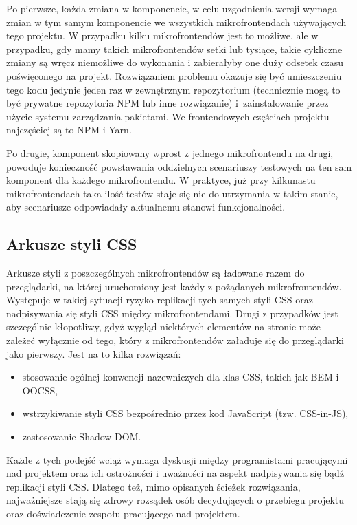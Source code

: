 \documentclass{SGGW-thesis}
\begin{document}
{Po pierwsze, każda zmiana w komponencie, w celu uzgodnienia wersji wymaga zmian w tym samym komponencie we wszystkich mikrofrontendach używających tego projektu. W przypadku kilku mikrofrontendów jest to możliwe, ale w przypadku, gdy mamy takich mikrofrontendów setki lub tysiące, takie cykliczne zmiany są wręcz niemożliwe do wykonania i zabierałyby one duży odsetek czasu poświęconego na projekt.
Rozwiązaniem problemu okazuje się być umieszczeniu tego kodu jedynie jeden raz w zewnętrznym repozytorium (technicznie mogą to być prywatne repozytoria NPM lub inne rozwiązanie) i~zainstalowanie przez użycie systemu zarządzania pakietami. We frontendowych częściach projektu najczęściej są to NPM i Yarn.

Po drugie, komponent skopiowany wprost z jednego mikrofrontendu na drugi, powoduje konieczność powstawania oddzielnych scenariuszy testowych na ten sam komponent dla każdego mikrofrontendu. W praktyce, już przy kilkunastu mikrofrontendach taka ilość testów staje się nie do utrzymania w takim stanie, aby scenariusze odpowiadały aktualnemu stanowi funkcjonalności.

\subsection{Arkusze styli CSS}
Arkusze styli z poszczególnych mikrofrontendów są ładowane razem do przeglądarki, na której uruchomiony jest każdy z pożądanych mikrofrontendów. Występuje w takiej sytuacji ryzyko replikacji tych samych styli CSS oraz nadpisywania się styli CSS między mikrofrontendami. Drugi z przypadków jest szczególnie kłopotliwy, gdyż wygląd niektórych elementów na stronie może zależeć wyłącznie od tego, który z mikrofrontendów załaduje się do przeglądarki jako pierwszy. Jest na to kilka rozwiązań:

\begin{itemize}
	\item stosowanie ogólnej konwencji nazewniczych dla klas CSS, takich jak BEM i OOCSS,
	\item wstrzykiwanie styli CSS bezpośrednio przez kod JavaScript (tzw. CSS-in-JS),
	\item zastosowanie Shadow DOM.
\end{itemize}

Każde z tych podejść wciąż wymaga dyskusji między programistami pracującymi nad projektem oraz ich ostrożności i uważności na aspekt nadpisywania się bądź replikacji styli CSS. Dlatego też, mimo opisanych ścieżek rozwiązania, najważniejsze stają się zdrowy rozsądek osób decydujących o przebiegu projektu oraz doświadczenie zespołu pracującego nad projektem.

}
\end{document}
